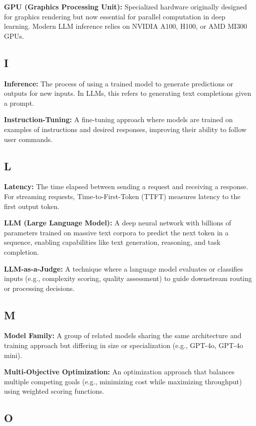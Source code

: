 \documentclass[english]{article}
\begin{document}
\textbf{GPU (Graphics Processing Unit):} Specialized hardware originally designed for graphics rendering but now essential for parallel computation in deep learning. Modern LLM inference relies on NVIDIA A100, H100, or AMD MI300 GPUs.

\subsection*{I}

\textbf{Inference:} The process of using a trained model to generate predictions or outputs for new inputs. In LLMs, this refers to generating text completions given a prompt.

\textbf{Instruction-Tuning:} A fine-tuning approach where models are trained on examples of instructions and desired responses, improving their ability to follow user commands.

\subsection*{L}

\textbf{Latency:} The time elapsed between sending a request and receiving a response. For streaming requests, Time-to-First-Token (TTFT) measures latency to the first output token.

\textbf{LLM (Large Language Model):} A deep neural network with billions of parameters trained on massive text corpora to predict the next token in a sequence, enabling capabilities like text generation, reasoning, and task completion.

\textbf{LLM-as-a-Judge:} A technique where a language model evaluates or classifies inputs (e.g., complexity scoring, quality assessment) to guide downstream routing or processing decisions.

\subsection*{M}

\textbf{Model Family:} A group of related models sharing the same architecture and training approach but differing in size or specialization (e.g., GPT-4o, GPT-4o mini).

\textbf{Multi-Objective Optimization:} An optimization approach that balances multiple competing goals (e.g., minimizing cost while maximizing throughput) using weighted scoring functions.

\subsection*{O}
\end{document}
